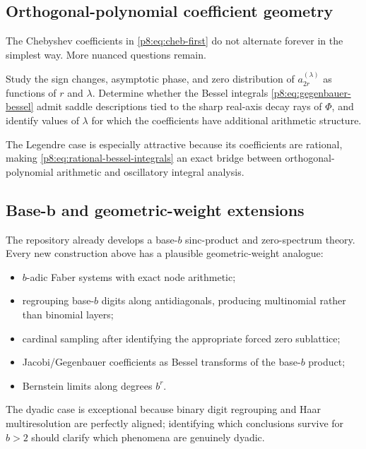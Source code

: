 \documentclass[11pt]{article}
\theoremstyle{definition}
\theoremstyle{remark}
\begin{document}
\subsection{Orthogonal-polynomial coefficient geometry}

The Chebyshev coefficients in \eqref{p8:eq:cheb-first} do not alternate forever
in the simplest way.  More nuanced questions remain.

\begin{openproblem}
Study the sign changes, asymptotic phase, and zero distribution of
$a_{2r}^{(\lambda)}$ as functions of $r$ and $\lambda$.  Determine whether the
Bessel integrals \eqref{p8:eq:gegenbauer-bessel} admit saddle descriptions tied
to the sharp real-axis decay rays of $\Phi$, and identify values of
$\lambda$ for which the coefficients have additional arithmetic structure.
\end{openproblem}

The Legendre case is especially attractive because its coefficients are
rational, making \eqref{p8:eq:rational-bessel-integrals} an exact bridge between
orthogonal-polynomial arithmetic and oscillatory integral analysis.

\subsection{Base-b and geometric-weight extensions}

The repository already develops a base-$b$ sinc-product and zero-spectrum
theory.  Every new construction above has a plausible geometric-weight
analogue:
\begin{itemize}
\item $b$-adic Faber systems with exact node arithmetic;
\item regrouping base-$b$ digits along antidiagonals, producing multinomial
      rather than binomial layers;
\item cardinal sampling after identifying the appropriate forced zero
      sublattice;
\item Jacobi/Gegenbauer coefficients as Bessel transforms of the base-$b$
      product;
\item Bernstein limits along degrees $b^r$.
\end{itemize}
The dyadic case is exceptional because binary digit regrouping and Haar
multiresolution are perfectly aligned; identifying which conclusions survive
for $b>2$ should clarify which phenomena are genuinely dyadic.
\end{document}
